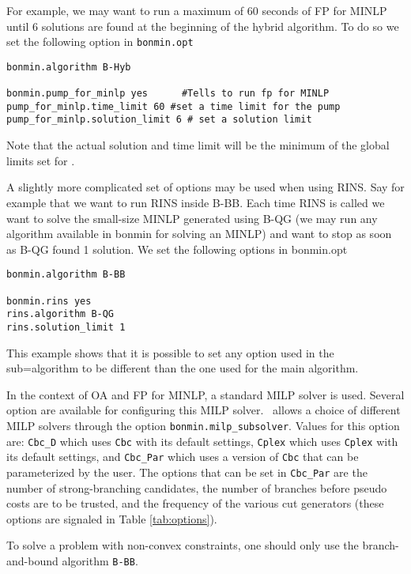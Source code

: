 For example, we may want to run a maximum of 60 seconds of FP for MINLP until 6 solutions are found at the beginning of the hybrid algorithm. To do so 
we set the following option in {\tt bonmin.opt}
\begin{verbatim}
bonmin.algorithm B-Hyb

bonmin.pump_for_minlp yes      #Tells to run fp for MINLP
pump_for_minlp.time_limit 60 #set a time limit for the pump
pump_for_minlp.solution_limit 6 # set a solution limit

\end{verbatim}

Note that the actual solution and time limit will be the minimum of the global limits set for \Bonmin.

A slightly more complicated set of options may be used when using RINS. Say for example that we want to run RINS inside B-BB. Each time RINS is called we want
to solve the small-size MINLP generated using B-QG (we may run any algorithm available in bonmin for solving an MINLP) and want to stop as soon as B-QG found 1 solution.
We set the following options in bonmin.opt

\begin{verbatim}
bonmin.algorithm B-BB

bonmin.rins yes
rins.algorithm B-QG
rins.solution_limit 1

\end{verbatim}
This example shows that it is possible to set any option used in the sub=algorithm to be different than the one used for the main algorithm.


In the context of OA and FP for MINLP, a standard MILP solver is used.
Several option are available for configuring this MILP solver.
\Bonmin\ allows a choice of different MILP solvers through the option
{\tt bonmin.milp\_subsolver}. Values for this option are: {\tt Cbc\_D} which uses {\tt Cbc} with its
default settings, {\tt Cplex} which uses {\tt Cplex} with its default settings, and
{\tt Cbc\_Par} which uses a version of {\tt Cbc} that can be parameterized by the user.
The options that can be set in {\tt Cbc\_Par} are the number of strong-branching candidates,
the number of branches before pseudo costs are to be trusted, and the frequency of the various cut generators
(these options are signaled in Table \ref{tab:options}).

\label{sec:non_convex}
To solve a problem with non-convex constraints, one should only use the branch-and-bound algorithm {\tt B-BB}.



